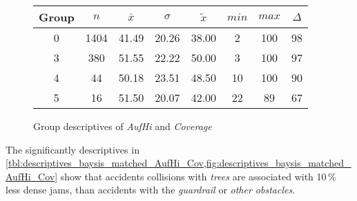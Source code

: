 \begin{figure}[ht!]
	\centering
	\begin{minipage}{0.5\textwidth}
		\tiny
		\setlength{\tabcolsep}{4pt}
		\centering
		\begin{tabular}{c|c|c|c|c|c|c|c}
			\toprule
			Group & $n$ & $\bar{x}$ & $\sigma$ & $\tilde{x}$ & $min$ & $max$ & $\Delta$ \\
			\midrule
			0 & 1404 & 41.49 & 20.26 & 38.00 & 2  & 100 & 98 \\ 
			3 & 380  & 51.55 & 22.22 & 50.00 & 3  & 100 & 97 \\ 
			4 & 44   & 50.18 & 23.51 & 48.50 & 10 & 100 & 90 \\ 
			5 & 16   & 51.50 & 20.07 & 42.00 & 22 & 89  & 67 \\  
			\bottomrule
		\end{tabular}
		\label{tbl:descriptives_baysis_matched_AufHi_Cov}
	\end{minipage}%
	\begin{minipage}{0.55\textwidth}
		\data 
        \pgfplotstablesort[sort key=mean, sort cmp=float >]{\datasorted}{\data}
        \tiny
        \centering
		\label{fig:descriptives_baysis_matched_AufHi_Cov}
	\end{minipage}%
	\caption{Group descriptives of \textit{AufHi} and \textit{Coverage}}
\end{figure}
The significantly descriptives in \cref{tbl:descriptives_baysis_matched_AufHi_Cov,fig:descriptives_baysis_matched_AufHi_Cov} show that accidents collisions with \textit{trees} are associated with 10\,\% less dense jams, than accidents with the \textit{guardrail} or \textit{other obstacles}.



